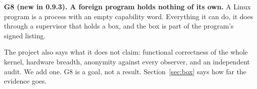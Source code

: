\textbf{G8 (new in 0.9.3). A foreign program holds nothing of its own.} A Linux program is a process with an empty capability word. Everything it can do, it does through a supervisor that holds a box, and the box is part of the program's signed listing.

The project also says what it does not claim: functional correctness of the whole kernel, hardware breadth, anonymity against every observer, and an independent audit. We add one. G8 is a goal, not a result. Section~\ref{sec:box} says how far the evidence goes.

